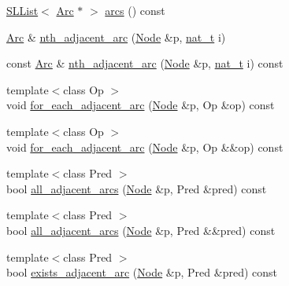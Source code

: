 \begin{DoxyCompactItemize}
\hyperlink{class_designar_1_1_s_l_list}{S\+L\+List}$<$ \hyperlink{namespace_designar_a3f55fb5513d62ff47cbc8f72b8e95d6f}{Arc} $\ast$ $>$ \hyperlink{class_designar_1_1_base_graph_af9d306a0474e8e3b38b7bd697b844d11}{arcs} () const
\item 
\hyperlink{namespace_designar_a3f55fb5513d62ff47cbc8f72b8e95d6f}{Arc} \& \hyperlink{class_designar_1_1_base_graph_aa0047160fb8424fe88dc7c1785f66827}{nth\+\_\+adjacent\+\_\+arc} (\hyperlink{namespace_designar_a5af326c65aa2bd26b26c410f2030d09e}{Node} \&p, \hyperlink{namespace_designar_aa72662848b9f4815e7bf31a7cf3e33d1}{nat\+\_\+t} i)
\item 
const \hyperlink{namespace_designar_a3f55fb5513d62ff47cbc8f72b8e95d6f}{Arc} \& \hyperlink{class_designar_1_1_base_graph_a3ca561f708fec1724d5c95192f98ef96}{nth\+\_\+adjacent\+\_\+arc} (\hyperlink{namespace_designar_a5af326c65aa2bd26b26c410f2030d09e}{Node} \&p, \hyperlink{namespace_designar_aa72662848b9f4815e7bf31a7cf3e33d1}{nat\+\_\+t} i) const
\item 
{\footnotesize template$<$class Op $>$ }\\void \hyperlink{class_designar_1_1_base_graph_a5e35c97bdf055f67e744f7d961ccb6a9}{for\+\_\+each\+\_\+adjacent\+\_\+arc} (\hyperlink{namespace_designar_a5af326c65aa2bd26b26c410f2030d09e}{Node} \&p, Op \&op) const
\item 
{\footnotesize template$<$class Op $>$ }\\void \hyperlink{class_designar_1_1_base_graph_a21553c1d96334e4cf2e0e2086e0efeba}{for\+\_\+each\+\_\+adjacent\+\_\+arc} (\hyperlink{namespace_designar_a5af326c65aa2bd26b26c410f2030d09e}{Node} \&p, Op \&\&op) const
\item 
{\footnotesize template$<$class Pred $>$ }\\bool \hyperlink{class_designar_1_1_base_graph_af7a57a1088105a79466546620bf830b3}{all\+\_\+adjacent\+\_\+arcs} (\hyperlink{namespace_designar_a5af326c65aa2bd26b26c410f2030d09e}{Node} \&p, Pred \&pred) const
\item 
{\footnotesize template$<$class Pred $>$ }\\bool \hyperlink{class_designar_1_1_base_graph_aaae4400215b8ea6b55941875981c3892}{all\+\_\+adjacent\+\_\+arcs} (\hyperlink{namespace_designar_a5af326c65aa2bd26b26c410f2030d09e}{Node} \&p, Pred \&\&pred) const
\item 
{\footnotesize template$<$class Pred $>$ }\\bool \hyperlink{class_designar_1_1_base_graph_a5208fcd131d919271e1d54f6e45ab3e9}{exists\+\_\+adjacent\+\_\+arc} (\hyperlink{namespace_designar_a5af326c65aa2bd26b26c410f2030d09e}{Node} \&p, Pred \&pred) const

\end{DoxyCompactItemize}
